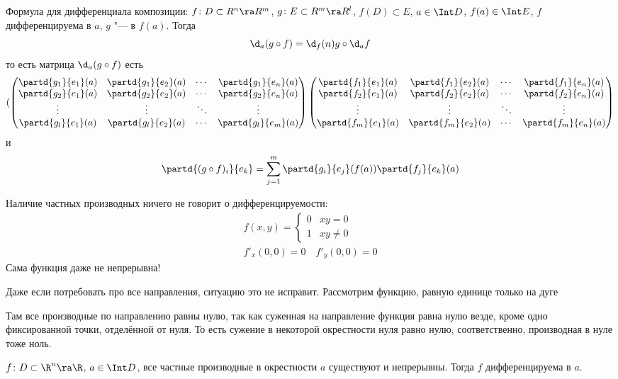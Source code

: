 \begin{conseq}
	Формула для дифференциала композиции:
	$f\colon D \subset R^n \ra R^m$, $g\colon E \subset R^m \ra R^l$, $f(D) \subset E$, $a \in \Int D$, $f(a) \in \Int E$,
	$f$ дифференцируема в $a$, $g$ "--- в $f(a)$.
	Тогда
	\[ \d_a(g \circ f) = \d_f(n) g \circ \d_a f \]
	то есть матрица $\d_a (g \circ f)$ есть
	\[(\begin{pmatrix}
		\partd{g_1}{e_1}(a) & \partd{g_1}{e_2}(a)
			&\cdots& \partd{g_1}{e_n}(a) \\
		\partd{g_2}{e_1}(a) & \partd{g_2}{e_2}(a)
			&\cdots& \partd{g_2}{e_n}(a) \\
		\vdots & \vdots & \ddots & \vdots \\
		\partd{g_l}{e_1}(a) & \partd{g_l}{e_2}(a)
			&\cdots& \partd{g_l}{e_m}(a) \\
	\end{pmatrix}\begin{pmatrix}
		\partd{f_1}{e_1}(a) & \partd{f_1}{e_2}(a)
			&\cdots& \partd{f_1}{e_n}(a) \\
		\partd{f_2}{e_1}(a) & \partd{f_2}{e_2}(a)
			&\cdots& \partd{f_2}{e_n}(a) \\
		\vdots & \vdots & \ddots & \vdots \\
		\partd{f_m}{e_1}(a) & \partd{f_m}{e_2}(a)
			&\cdots& \partd{f_m}{e_n}(a) \\
	\end{pmatrix}\]
	и
	\[ \partd{(g \circ f)_i}{e_k} = \sum_{j = 1}^m \partd{g_i}{e_j} (f(a)) \partd{f_j}{e_k} (a) \]
\end{conseq}

\begin{Rem}
	Наличие частных производных ничего не говорит о дифференцируемости:
	\begin{gather*}
		f(x, y) = \begin{cases} 0 & xy = 0 \\ 1 & xy \ne 0 \end{cases} \\
		f'_x(0, 0) = 0 \quad f'_y(0, 0) = 0
	\end{gather*}
	Сама функция даже не непрерывна!

	Даже если потребовать про все направления, ситуацию это не исправит. Рассмотрим функцию, равную единице только на дуге

	\begin{center}
	
	\end{center}

	Там все производные по направлению равны нулю, так как суженная на направление функция равна нулю везде, кроме одно фиксированной точки, отделённой от нуля.
	То есть сужение в некоторой окрестности нуля равно нулю, соответственно, производная в нуле тоже ноль.
\end{Rem}

\begin{theorem}
	$f\colon D \subset \R^n \ra \R$, $a \in \Int D$, все частные производные в окрестности $a$ существуют и непрерывны.
	Тогда $f$ дифференцируема в $a$.
\end{theorem}